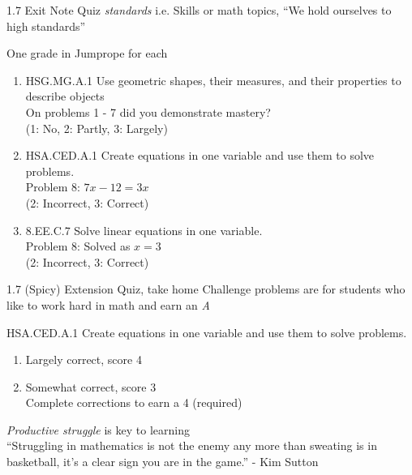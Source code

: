 \begin{frame}{1.7 Exit Note Quiz \emph{standards}}
  {i.e. Skills or math topics, ``We hold ourselves to high standards''}
  \begin{block}{One grade in Jumprope for each}
      \begin{enumerate}
        \item {\tiny HSG.MG.A.1} Use geometric shapes, their measures, and their properties to describe objects \\[0.1cm]
          On problems 1 - 7 did you demonstrate mastery? \\
          (1: No, 2: Partly, 3: Largely) \\[0.2cm]
        \item {\tiny HSA.CED.A.1} Create equations in one variable and use them to solve problems. \\[0.1cm]
          Problem 8: $7x-12=3x$ \\
          (2: Incorrect, 3: Correct) \\[0.2cm]
        \item {\tiny 8.EE.C.7} Solve linear equations in one variable. \\[0.1cm]
          Problem 8: Solved as $x=3$ \\
          (2: Incorrect, 3: Correct)
        \end{enumerate}
      \end{block}
      \end{frame}

\begin{frame}{1.7 (Spicy) Extension Quiz, take home}
  {Challenge problems are for students who like to work hard in math and earn an \emph{A}}
  \begin{block}{{\tiny HSA.CED.A.1} \newline Create equations in one variable and use them to solve problems.}
      \begin{enumerate}
        \item Largely correct, score 4
        \item Somewhat correct, score 3 \\[0.2cm]
        Complete corrections to earn a 4 (required)
        \end{enumerate}
      \end{block} \vspace{0.5cm}
      \emph{Productive struggle} is key to learning \\[0.2cm]
      ``Struggling in mathematics is not the enemy any more than sweating is in basketball, it's a clear sign you are in the game.'' - Kim Sutton
      \vspace{1cm}
      \end{frame}

